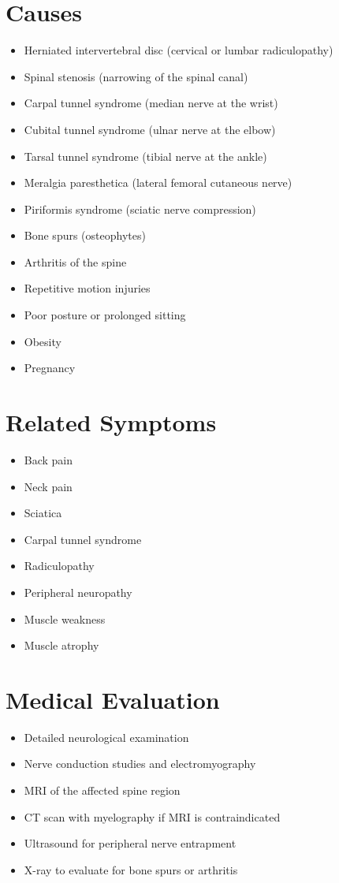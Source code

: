 \section*{Causes}
\begin{itemize}
\item Herniated intervertebral disc (cervical or lumbar radiculopathy)
\item Spinal stenosis (narrowing of the spinal canal)
\item Carpal tunnel syndrome (median nerve at the wrist)
\item Cubital tunnel syndrome (ulnar nerve at the elbow)
\item Tarsal tunnel syndrome (tibial nerve at the ankle)
\item Meralgia paresthetica (lateral femoral cutaneous nerve)
\item Piriformis syndrome (sciatic nerve compression)
\item Bone spurs (osteophytes)
\item Arthritis of the spine
\item Repetitive motion injuries
\item Poor posture or prolonged sitting
\item Obesity
\item Pregnancy
\end{itemize}

\section*{Related Symptoms}
\begin{itemize}
\item Back pain
\item Neck pain
\item Sciatica
\item Carpal tunnel syndrome
\item Radiculopathy
\item Peripheral neuropathy
\item Muscle weakness
\item Muscle atrophy
\end{itemize}

\section*{Medical Evaluation}
\begin{itemize}
\item Detailed neurological examination
\item Nerve conduction studies and electromyography
\item MRI of the affected spine region
\item CT scan with myelography if MRI is contraindicated
\item Ultrasound for peripheral nerve entrapment
\item X-ray to evaluate for bone spurs or arthritis
\end{itemize}

